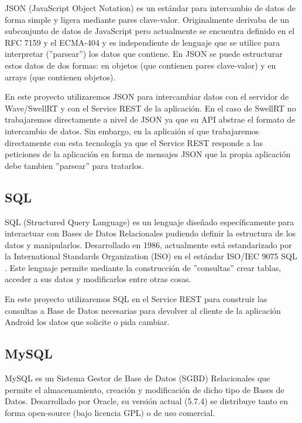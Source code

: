 	JSON \cite{ref:json} (JavaScript Object Notation) es un estándar para intercambio de datos de forma simple y ligera mediante pares clave-valor. Originalmente derivaba de un subconjunto de datos de JavaScript pero actualmente se encuentra definido en el RFC 7159 y el ECMA-404 y es independiente de lenguaje que se utilice para interpretar (''parsear'') los datos que contiene. En JSON se puede estructurar estos datos de dos formas: en objetos (que contienen pares clave-valor) y en arrays (que contienen objetos).
	
	En este proyecto utilizaremos JSON para intercambiar datos con el servidor de Wave/SwellRT y con el Service REST de la aplicación. En el caso de SwellRT no trabajaremos directamente a nivel de JSON ya que su API abstrae el formato de intercambio de datos. Sin embargo, en la aplicaión sí que trabajaremos directamente con esta tecnología ya que el Service REST responde a las peticiones de la aplicación en forma de mensajes JSON que la propia aplicación debe tambien ''parsear'' para tratarlos.    
    
    \subsection{SQL}\label{ssec:sql}
    
	SQL \cite{ref:sql} (Structured Query Language) es un lenguaje diseñado específicamente para interactuar con Bases de Datos Relacionales pudiendo definir la estructura de los datos y manipularlos. Desarrollado en 1986, actualmente está estandarizado por la International Standards Organization (ISO) en el estándar ISO/IEC 9075 SQL \cite{ref:sql}. Este lenguaje permite mediante la construcción de ''consultas'' crear tablas, acceder a sus datos y modificarlos entre otras cosas.
	
	En este proyecto utilizaremos SQL en el Service REST para construir las consultas a Base de Datos necesarias para devolver al cliente de la aplicación Android los datos que solicite o pida cambiar.  
    
    \subsection{MySQL}\label{ssec:mysql}
    
	MySQL \cite{ref:mysql} es un Sistema Gestor de Base de Datos (SGBD) Relacionales que permite el almacenamiento, creación y modificación de dicho tipo de Bases de Datos. Desarrollado por Oracle, su versión actual (5.7.4) se distribuye tanto en forma open-source (bajo licencia GPL) o de uso comercial.     
	
